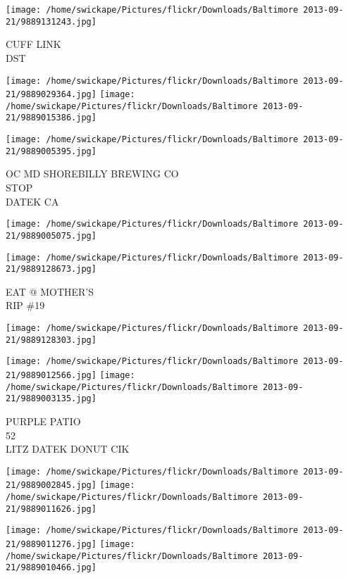 \documentclass[10pt,letterpaper]{article}
\begin{document}
\vspace{0.25in}
\texttt{[image: /home/swickape/Pictures/flickr/Downloads/Baltimore 2013-09-21/9889131243.jpg]}

CUFF LINK\\
DST
\pagebreak

\texttt{[image: /home/swickape/Pictures/flickr/Downloads/Baltimore 2013-09-21/9889029364.jpg]}
\texttt{[image: /home/swickape/Pictures/flickr/Downloads/Baltimore 2013-09-21/9889015386.jpg]}

\vspace{0.25in}
\texttt{[image: /home/swickape/Pictures/flickr/Downloads/Baltimore 2013-09-21/9889005395.jpg]}

OC MD SHOREBILLY BREWING CO\\
STOP\\
DATEK CA
\pagebreak

\texttt{[image: /home/swickape/Pictures/flickr/Downloads/Baltimore 2013-09-21/9889005075.jpg]}

\vspace{0.25in}
\texttt{[image: /home/swickape/Pictures/flickr/Downloads/Baltimore 2013-09-21/9889128673.jpg]}

EAT @ MOTHER'S\\
RIP \#19
\pagebreak

\texttt{[image: /home/swickape/Pictures/flickr/Downloads/Baltimore 2013-09-21/9889128303.jpg]}

\vspace{0.25in}
\texttt{[image: /home/swickape/Pictures/flickr/Downloads/Baltimore 2013-09-21/9889012566.jpg]}
\texttt{[image: /home/swickape/Pictures/flickr/Downloads/Baltimore 2013-09-21/9889003135.jpg]}

PURPLE PATIO\\
52\\
LITZ DATEK DONUT CIK
\pagebreak

\texttt{[image: /home/swickape/Pictures/flickr/Downloads/Baltimore 2013-09-21/9889002845.jpg]}
\texttt{[image: /home/swickape/Pictures/flickr/Downloads/Baltimore 2013-09-21/9889011626.jpg]}

\texttt{[image: /home/swickape/Pictures/flickr/Downloads/Baltimore 2013-09-21/9889011276.jpg]}
\texttt{[image: /home/swickape/Pictures/flickr/Downloads/Baltimore 2013-09-21/9889010466.jpg]}
\end{document}
